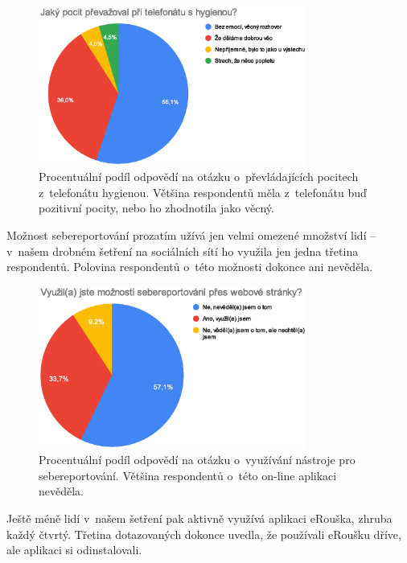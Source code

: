 \begin{figure}
\begin{center}
    \includegraphics[width=250pt]{./pic/graf1.eps}
\end{center}    

\caption{Procentuální podíl odpovědí na otázku o~převládajících pocitech z~telefonátu  hygienou. Většina respondentů měla z~telefonátu buď pozitivní pocity, nebo ho zhodnotila jako věcný.}
 
 \end{figure}

Možnost sebereportování prozatím užívá jen velmi omezené množství lidí – v~našem drobném šetření na sociálních sítí ho využila jen jedna třetina respondentů. Polovina respondentů o~této možnosti dokonce ani nevěděla. 

\begin{figure}
\begin{center}
    \includegraphics[width=250pt]{./pic/graf2.eps}
 \end{center}    
    \caption{Procentuální podíl odpovědí na otázku o~využívání nástroje pro sebereportování. Většina respondentů o~této on-line aplikaci nevěděla.}
\end{figure}

Ještě méně lidí v~našem šetření pak aktivně využívá aplikaci eRouška, zhruba každý čtvrtý. Třetina dotazovaných dokonce uvedla, že používali eRoušku dříve, ale aplikaci si odinstalovali.


